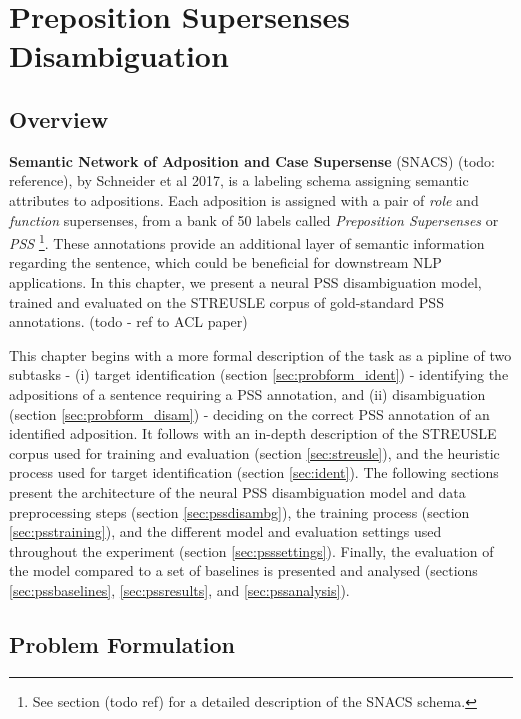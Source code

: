 
\chapter{Preposition Supersenses Disambiguation} %

\label{Chapter2} %

\section{Overview}
\textbf{Semantic Network of Adposition and Case Supersense} (SNACS) (todo: reference), by Schneider et al 2017, is a labeling schema assigning semantic attributes to adpositions. Each adposition is assigned with a pair of \emph{role} and \emph{function} supersenses, from a bank of 50 labels called \emph{Preposition Supersenses} or \emph{PSS} \footnote{See section (todo ref) for a detailed description of the SNACS schema.}. These annotations provide an additional layer of semantic information regarding the sentence, which could be beneficial for downstream NLP applications. In this chapter, we present a neural PSS disambiguation model, trained and evaluated on the STREUSLE corpus of gold-standard PSS annotations. (todo - ref to ACL paper)

This chapter begins with a more formal description of the task as a pipline of two subtasks - (i) target identification (section \ref{sec:probform_ident}) - identifying the adpositions of a sentence requiring a PSS annotation, and (ii) disambiguation (section \ref{sec:probform_disam}) - deciding on the correct PSS annotation of an identified adposition. It follows with an in-depth description of the STREUSLE corpus used for training and evaluation (section \ref{sec:streusle}), and the heuristic process used for target identification (section \ref{sec:ident}). The following sections present the architecture of the neural PSS disambiguation model and data preprocessing steps (section \ref{sec:pssdisambg}), the training process (section \ref{sec:psstraining}), and the different model and evaluation settings used throughout the experiment (section \ref{sec:psssettings}).  Finally, the evaluation of the model compared to a set of baselines is presented and analysed (sections \ref{sec:pssbaselines}, \ref{sec:pssresults}, and \ref{sec:pssanalysis}).




\section{Problem Formulation} \label{sec:probform}
